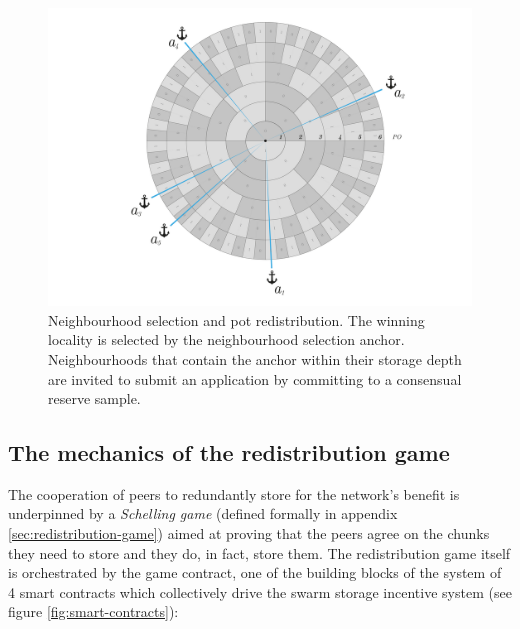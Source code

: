 \begin{figure}[!ht]
  \centering
    \includegraphics[width=\textwidth]{fig/nhd-selection.pdf.pdf    }
  \caption[Neighbourhood selection and pot redistribution]{Neighbourhood selection and pot redistribution. The winning locality is selected by the neighbourhood selection anchor. Neighbourhoods that contain the anchor within their storage depth are invited to submit an application by committing to a consensual reserve sample. }
\label{fig:neighbourhood-selection}
\end{figure}    

    


\subsection{The mechanics of the redistribution game}\label{sec:mechanics}

The cooperation of peers to redundantly store for the network's benefit is underpinned by a \emph{Schelling game} (defined formally in appendix \ref{sec:redistribution-game}) aimed at proving that the peers agree on the chunks they need to store and they do, in fact, store them. The redistribution game itself is orchestrated by the game contract, one of the building blocks of the system of 4 smart contracts which collectively drive the swarm storage incentive system (see figure \ref{fig:smart-contracts}):

